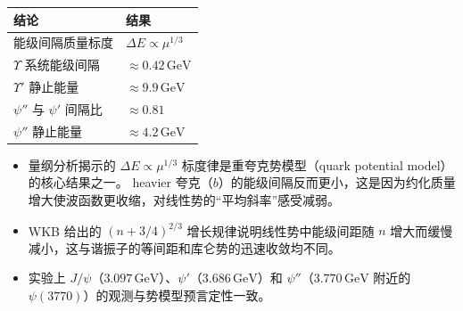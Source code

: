 \begin{formulabox}[答案汇总]
\begin{center}
\begin{tabular}{ll}
\toprule
\textbf{结论} & \textbf{结果} \\
\midrule
能级间隔质量标度 & $\Delta E\propto\mu^{1/3}$ \\
$\Upsilon$ 系统能级间隔 & $\approx0.42\,\text{GeV}$ \\
$\Upsilon'$ 静止能量 & $\approx9.9\,\text{GeV}$ \\
$\psi''$ 与 $\psi'$ 间隔比 & $\approx0.81$ \\
$\psi''$ 静止能量 & $\approx4.2\,\text{GeV}$ \\
\bottomrule
\end{tabular}
\end{center}
\end{formulabox}

\begin{insightbox}[物理图像]
\begin{itemize}
    \item 量纲分析揭示的 $\Delta E\propto\mu^{1/3}$ 标度律是重夸克势模型（quark potential model）的核心结果之一。 heavier 夸克（$b$）的能级间隔反而更小，这是因为约化质量增大使波函数更收缩，对线性势的``平均斜率''感受减弱。
    \item WKB 给出的 $(n+3/4)^{2/3}$ 增长规律说明线性势中能级间距随 $n$ 增大而缓慢减小，这与谐振子的等间距和库仑势的迅速收敛均不同。
    \item 实验上 $J/\psi$（$3.097\,\text{GeV}$）、$\psi'$（$3.686\,\text{GeV}$）和 $\psi''$（$3.770\,\text{GeV}$ 附近的 $\psi(3770)$）的观测与势模型预言定性一致。
\end{itemize}
\end{insightbox}
